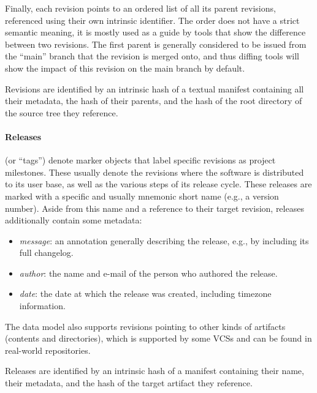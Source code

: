 Finally, each revision points to an ordered list of all its parent revisions,
referenced using their own intrinsic identifier. The order does not have a
strict semantic meaning, it is mostly used as a guide by tools that show the
difference between two revisions. The first parent is generally considered to
be issued from the ``main'' branch that the revision is merged onto, and thus
diffing tools will show the impact of this revision on the main branch by
default.

Revisions are identified by an intrinsic hash of a textual manifest containing
all their metadata, the hash of their parents, and the hash of the root
directory of the source tree they reference.


\begin{figure}\centering
{}
\end{figure}
\paragraph{\textbf{Releases}} (or ``tags'') denote marker objects that label
specific revisions as project milestones. These usually denote the revisions
where the software is distributed to its user base, as well as the various
steps of its release cycle. These releases are marked with a specific and
usually mnemonic short name (e.g., a version number). Aside from this name and
a reference to their target revision, releases additionally contain some
metadata:

\begin{itemize}
    \setlength\itemsep{0em}
    \item \emph{message}: an annotation generally describing the release, e.g.,
        by including its full changelog.
    \item \emph{author}: the name and e-mail of the person who authored the
        release.
    \item \emph{date}: the date at which the release was created, including
        timezone information.
\end{itemize}

The data model also supports revisions pointing to other kinds of artifacts
(contents and directories), which is supported by some \glspl{VCS} and can be
found in real-world repositories.

Releases are identified by an intrinsic hash of a manifest containing their
name, their metadata, and the hash of the target artifact they reference.


